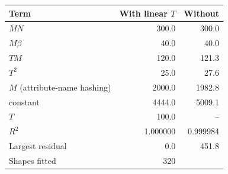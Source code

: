 \begin{tabular}{lrr}
\toprule
Term & With linear $T$ & Without \\
\midrule
$M N$ & 300.0 & 300.0 \\
$M\beta$ & 40.0 & 40.0 \\
$T M$ & 120.0 & 121.3 \\
$T^2$ & 25.0 & 27.6 \\
$M$ (attribute-name hashing) & 2000.0 & 1982.8 \\
constant & 4444.0 & 5009.1 \\
$T$ & 100.0 & -- \\
$R^2$ & 1.000000 & 0.999984 \\
Largest residual & 0.0 & 451.8 \\
Shapes fitted & 320 &  \\
\bottomrule
\end{tabular}
